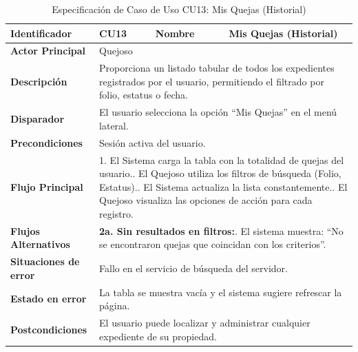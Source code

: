 \vspace{0.8cm}

\begingroup
\setlength{\parskip}{0pt}
\begin{longtable}{|p{3.5cm}|p{2cm}|p{2.5cm}|p{7cm}|}
\caption{Especificación de Caso de Uso CU13: Mis Quejas (Historial)}
\label{tab:cu13_mis_quejas} \\
\hline
\textbf{Identificador} & CU13 & \textbf{Nombre} & Mis Quejas (Historial) \\ \hline
\textbf{Actor Principal} & \multicolumn{3}{p{11.5cm}|}{Quejoso} \\ \hline
\textbf{Descripción} & \multicolumn{3}{p{11.5cm}|}{Proporciona un listado tabular de todos los expedientes registrados por el usuario, permitiendo el filtrado por folio, estatus o fecha.} \\ \hline
\textbf{Disparador} & \multicolumn{3}{p{11.5cm}|}{El usuario selecciona la opción ``Mis Quejas'' en el menú lateral.} \\ \hline
\textbf{Precondiciones} & \multicolumn{3}{p{11.5cm}|}{Sesión activa del usuario.} \\ \hline
\textbf{Flujo Principal} & \multicolumn{3}{p{11.5cm}|}{1. El Sistema carga la tabla con la totalidad de quejas del usuario.\newline 2. El Quejoso utiliza los filtros de búsqueda (Folio, Estatus).\newline 3. El Sistema actualiza la lista constantemente.\newline 4. El Quejoso visualiza las opciones de acción para cada registro.} \\ \hline
\textbf{Flujos Alternativos} & \multicolumn{3}{p{11.5cm}|}{\textbf{2a. Sin resultados en filtros:}\newline 1. El sistema muestra: ``No se encontraron quejas que coincidan con los criterios''.} \\ \hline
\textbf{Situaciones de error} & \multicolumn{3}{p{11.5cm}|}{Fallo en el servicio de búsqueda del servidor.} \\ \hline
\textbf{Estado en error} & \multicolumn{3}{p{11.5cm}|}{La tabla se muestra vacía y el sistema sugiere refrescar la página.} \\ \hline
\textbf{Postcondiciones} & \multicolumn{3}{p{11.5cm}|}{El usuario puede localizar y administrar cualquier expediente de su propiedad.} \\ \hline
\end{longtable}
\endgroup

\vspace{0.8cm}

